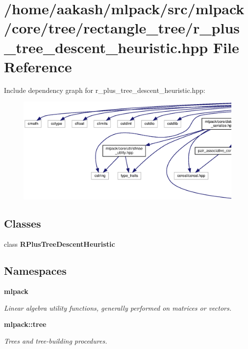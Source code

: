 \section{/home/aakash/mlpack/src/mlpack/core/tree/rectangle\+\_\+tree/r\+\_\+plus\+\_\+tree\+\_\+descent\+\_\+heuristic.hpp File Reference}
\label{r__plus__tree__descent__heuristic_8hpp}
Include dependency graph for r\+\_\+plus\+\_\+tree\+\_\+descent\+\_\+heuristic.\+hpp\+:
\nopagebreak
\begin{figure}[H]
\begin{center}
\leavevmode
\includegraphics[width=350pt]{r__plus__tree__descent__heuristic_8hpp__incl}
\end{center}
\end{figure}
\subsection*{Classes}
\begin{DoxyCompactItemize}
\item 
class \textbf{ R\+Plus\+Tree\+Descent\+Heuristic}
\end{DoxyCompactItemize}
\subsection*{Namespaces}
\begin{DoxyCompactItemize}
\item 
 \textbf{ mlpack}
\begin{DoxyCompactList}\small\item\em Linear algebra utility functions, generally performed on matrices or vectors. \end{DoxyCompactList}\item 
 \textbf{ mlpack\+::tree}
\begin{DoxyCompactList}\small\item\em Trees and tree-\/building procedures. \end{DoxyCompactList}\end{DoxyCompactItemize}


